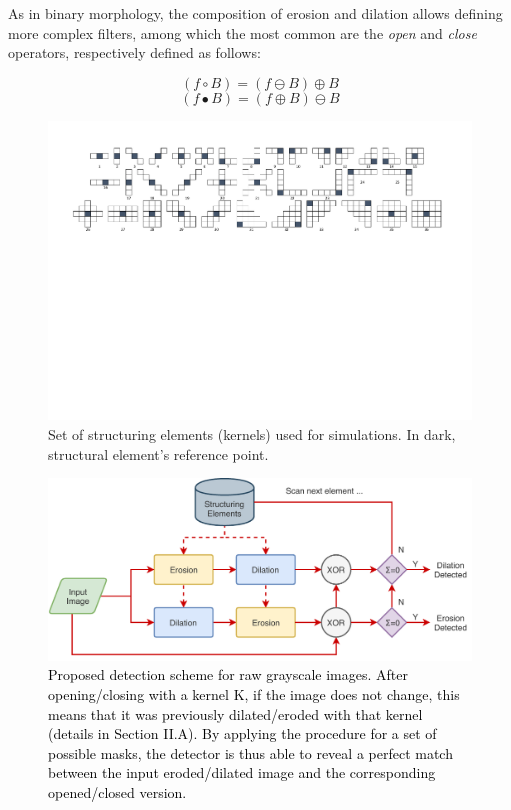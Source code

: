 \documentclass{ieeeaccess}
\newcommand{\revisedtext}[1]{\textcolor{black}{#1}}
\begin{document}
As in binary morphology, the composition of erosion and dilation allows defining more complex filters, among which the most common are the \textit{open} and \textit{close} operators, respectively defined as follows:

\begin{equation}
(f \circ B) = (f \ominus B) \oplus B
\end{equation}
\vspace{-0.5cm}
\begin{equation}
(f \bullet B) = (f \oplus B) \ominus B
\end{equation}

\begin{figure}[th!]
	\centering
	\includegraphics[width=\linewidth]{kernels}
	\caption{Set of structuring elements (kernels) used for simulations. In dark, structural element's reference point.}
	\label{fig:masks}
\end{figure}

\begin{figure}[th!]
	\centering
	\includegraphics[width=0.7\linewidth]{diagram1}
	\caption{\revisedtext{Proposed detection scheme for raw grayscale images. After opening/closing with a kernel K, if the image does not change, this means that it was previously dilated/eroded with that kernel (details in Section II.A). By applying the procedure for a set of possible masks, the detector is thus able to reveal a perfect match between the input eroded/dilated image and the corresponding opened/closed version.}}
	\label{fig:scheme}
\end{figure}
\end{document}
